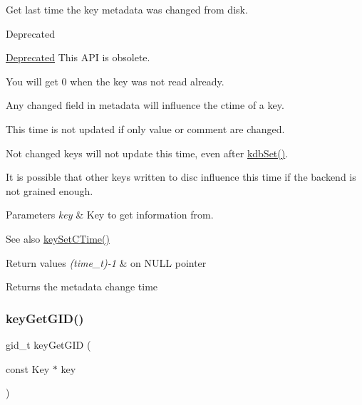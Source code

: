 Get last time the key metadata was changed from disk. 

\begin{DoxyRefDesc}{Deprecated}
\item[\hyperlink{deprecated__deprecated000024}{Deprecated}]This A\+PI is obsolete.\end{DoxyRefDesc}


You will get 0 when the key was not read already.

Any changed field in metadata will influence the ctime of a key.

This time is not updated if only value or comment are changed.

Not changed keys will not update this time, even after \hyperlink{group__kdb_ga11436b058408f83d303ca5e996832bcf}{kdb\+Set()}.

It is possible that other keys written to disc influence this time if the backend is not grained enough.


\begin{DoxyParams}{Parameters}
{\em key} & Key to get information from. \\
\hline
\end{DoxyParams}
\begin{DoxySeeAlso}{See also}
\hyperlink{group__meta_ga9f502ecab8ab43f0b17220fcc95f3fa5}{key\+Set\+C\+Time()} 
\end{DoxySeeAlso}

\begin{DoxyRetVals}{Return values}
{\em (time\+\_\+t)-\/1} & on N\+U\+LL pointer \\
\hline
\end{DoxyRetVals}
\begin{DoxyReturn}{Returns}
the metadata change time 
\end{DoxyReturn}
\mbox{\label{group__meta_ga46a95e81d7d7f4e3eb59e60e5f3738c0}} 
\subsubsection{\texorpdfstring{key\+Get\+G\+I\+D()}{keyGetGID()}}
{\footnotesize\ttfamily gid\+\_\+t key\+Get\+G\+ID (\begin{DoxyParamCaption}\item[{const Key $\ast$}]{key }\end{DoxyParamCaption})}



